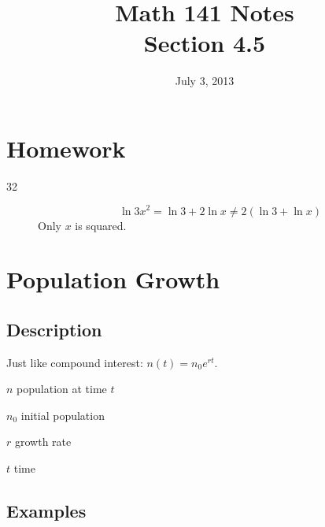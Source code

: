 \documentclass{exam}
\title{Math 141 Notes \\ Section 4.5}
\date{July 3, 2013}
\begin{document}
  \maketitle
  \tableofcontents

  \section{Homework}
  \begin{description}
    \item[32]
      \[
        \ln 3x^2 = \ln 3 + 2 \ln x \neq 2 \left( \ln 3 + \ln x \right)
      \]
      Only $x$ is squared.

  \end{description}

  \section{Population Growth}

  \subsection{Description}
  Just like compound interest: $n(t) = n_0 e^{rt}$.

  \begin{itemize*}
    \item $n$ population at time $t$
    \item $n_0$ initial population
    \item $r$ growth rate
    \item $t$ time
  \end{itemize*}

  \subsection{Examples}
\end{document}
